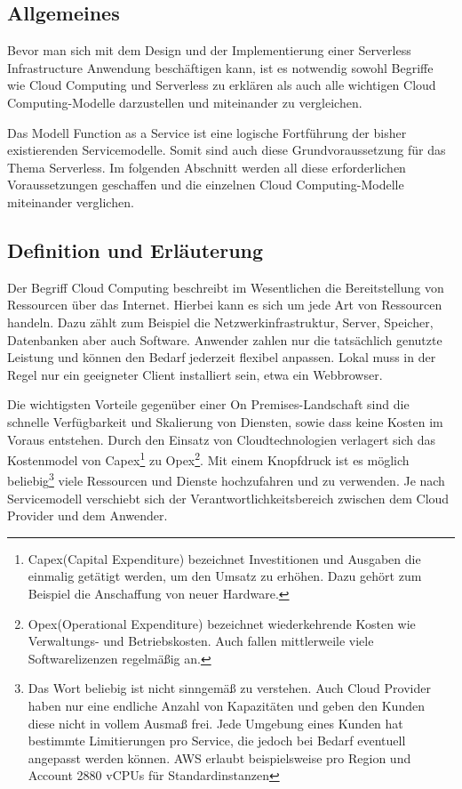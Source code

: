 \subsection{Allgemeines}

Bevor man sich mit dem Design und der Implementierung einer Serverless Infrastructure Anwendung beschäftigen kann, ist es notwendig sowohl Begriffe wie Cloud Computing und Serverless zu erklären als auch alle wichtigen Cloud Computing-Modelle darzustellen und miteinander zu vergleichen.

Das Modell Function as a Service ist eine logische Fortführung der bisher existierenden Servicemodelle.
Somit sind auch diese Grundvoraussetzung für das Thema Serverless.
Im folgenden Abschnitt werden all diese erforderlichen Voraussetzungen geschaffen und die einzelnen Cloud Computing-Modelle miteinander verglichen.


\subsection{Definition und Erläuterung}
Der Begriff Cloud Computing beschreibt im Wesentlichen die Bereitstellung von Ressourcen über das Internet.
Hierbei kann es sich um jede Art von Ressourcen handeln. Dazu zählt zum Beispiel die Netzwerkinfrastruktur, Server, Speicher, Datenbanken aber auch Software.
Anwender zahlen nur die tatsächlich genutzte Leistung und können den Bedarf jederzeit flexibel anpassen.
Lokal muss in der Regel nur ein geeigneter Client installiert sein, etwa ein Webbrowser.

Die wichtigsten Vorteile gegenüber einer On Premises-Landschaft sind die schnelle Verfügbarkeit und Skalierung von Diensten, sowie dass keine Kosten im Voraus entstehen.
Durch den Einsatz von Cloudtechnologien verlagert sich das Kostenmodel von Capex\footnote{ Capex(Capital Expenditure) bezeichnet Investitionen und Ausgaben die einmalig getätigt werden,
um den Umsatz zu erhöhen. Dazu gehört zum Beispiel die Anschaffung von neuer Hardware. } zu Opex\footnote{Opex(Operational Expenditure) bezeichnet wiederkehrende Kosten wie Verwaltungs- und Betriebskosten.
Auch fallen mittlerweile viele Softwarelizenzen regelmäßig an. }.
Mit einem Knopfdruck ist es möglich beliebig\footnote{Das Wort beliebig ist nicht sinngemäß zu verstehen.
Auch Cloud Provider haben nur eine endliche Anzahl von Kapazitäten und geben den Kunden diese nicht in vollem Ausmaß frei.
Jede Umgebung eines Kunden hat bestimmte Limitierungen pro Service, die jedoch bei Bedarf eventuell angepasst werden können.
AWS erlaubt beispielsweise pro Region und Account 2880 vCPUs für Standardinstanzen } viele Ressourcen und Dienste hochzufahren und zu verwenden.
Je nach Servicemodell verschiebt sich der Verantwortlichkeitsbereich zwischen dem Cloud Provider und dem Anwender.
\cite[]{CloudComputingDef}

